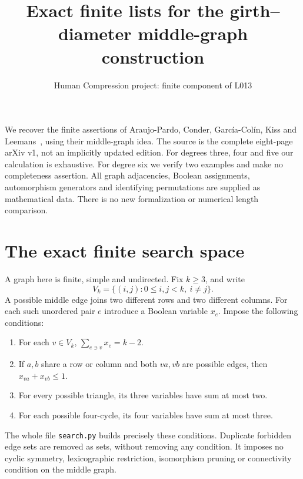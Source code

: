 \documentclass[11pt,a4paper]{article}
\title{Exact finite lists for the girth--diameter middle-graph construction}
\author{Human Compression project: finite component of L013}
\date{}
\begin{document}
\maketitle
We recover the finite assertions of Araujo-Pardo, Conder, Garc\'ia-Col\'in,
Kiss and Leemans~\cite{source}, using their middle-graph idea. The source
is the complete eight-page arXiv v1, not an implicitly updated edition.
For degrees three, four and five our calculation is exhaustive. For degree
six we verify two examples and make no completeness assertion. All graph
adjacencies, Boolean assignments, automorphism generators and identifying
permutations are supplied as mathematical data. There is no new formalization
or numerical length comparison.

\section{The exact finite search space}
A graph here is finite, simple and undirected. Fix $k\geq3$, and write
\[
 V_k=\{(i,j):0\leq i,j<k,\ i\ne j\}.
\]
A possible middle edge joins two different rows and two different columns.
For each such unordered pair $e$ introduce a Boolean variable $x_e$.
Impose the following conditions:
\begin{enumerate}
\item For each $v\in V_k$, $\sum_{e\ni v}x_e=k-2$.
\item If $a,b$ share a row or column and both $va,vb$ are possible edges,
then $x_{va}+x_{vb}\leq1$.
\item For every possible triangle, its three variables have sum at most two.
\item For each possible four-cycle, its four variables have sum at most three.
\end{enumerate}
The whole file \texttt{search.py} builds precisely these conditions. Duplicate
forbidden edge sets are removed as sets, without removing any condition. It
imposes no cyclic symmetry, lexicographic restriction, isomorphism pruning or
connectivity condition on the middle graph.
\end{document}
